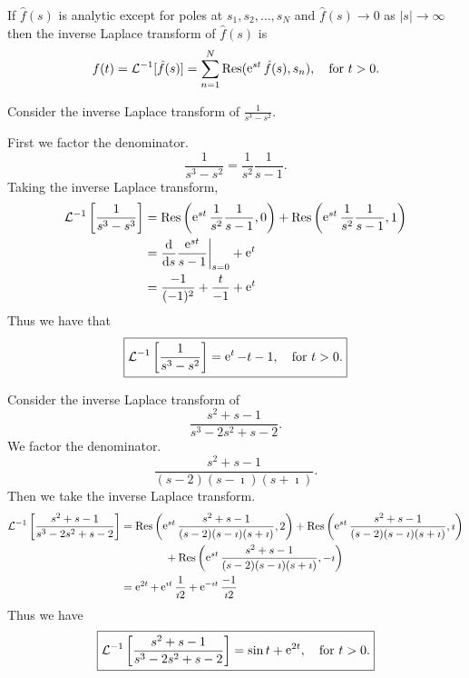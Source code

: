\begin{Result}
  \label{Res_lt_poles}
  If $\hat{f}(s)$ is analytic except for poles at $s_1, s_2, \ldots, s_N$ and 
  $\hat{f}(s) \to 0$ as $|s| \to \infty$ then the inverse Laplace transform of 
  $\hat{f}(s)$ is
  \[ 
  f(t) = \mathcal{L}^{-1}[\hat{f}(s)] = \sum_{n=1}^N \mathop{\mathrm{Res}}\nolimits(\mathop{\mathrm{e}}\nolimits^{s t} \hat{f}(s), s_n), 
  \quad \mathrm{for}\ t > 0.
  \]
\end{Result}













\begin{Example}
  Consider the inverse Laplace transform of $\frac{1}{s^3 - s^2}$.

  First we factor the denominator.
  \[ 
  \frac{1}{s^3 - s^2} = \frac{1}{s^2} \frac{1}{s-1}. 
  \]
  Taking the inverse Laplace transform,
  \begin{align*}
    \mathcal{L}^{-1} \left[ \frac{1}{s^3-s^3} \right]
    &= \mathop{\mathrm{Res}}\nolimits \left( \mathop{\mathrm{e}}\nolimits^{s t} \frac{1}{s^2} \frac{1}{s-1}, 0 \right) + 
    \mathop{\mathrm{Res}}\nolimits \left( \mathop{\mathrm{e}}\nolimits^{s t} \frac{1}{s^2} \frac{1}{s-1}, 1 \right) \\
    &= \frac{\mathrm{d}}{\mathrm{d} s} \frac{\mathop{\mathrm{e}}\nolimits^{s t}}{s-1}\bigg|_{s=0} + \mathop{\mathrm{e}}\nolimits^t \\
    &= \frac{-1}{(-1)^2} + \frac{t}{-1} + \mathop{\mathrm{e}}\nolimits^t 
  \end{align*}
  Thus we have that
  \[ 
  \boxed{
    \mathcal{L}^{-1}\left[\frac{1}{s^3-s^2} \right] = \mathop{\mathrm{e}}\nolimits^t-t-1,
    \quad \mathrm{for}\ t > 0.
    }
  \]
\end{Example}







\begin{Example}
  Consider the inverse Laplace transform of
  \[ 
  \frac{s^2 + s - 1}{s^3 - 2s^2 + s - 2}.
  \]
  We factor the denominator.
  \[
  \frac{s^2 + s - 1}{(s - 2)(s - \imath)(s + \imath)}.
  \]
  Then we take the inverse Laplace transform.
  \begin{align*}
    \mathcal{L}^{-1}\left[\frac{s^2+s-1}{s^3-2s^2+s-2}\right]
    &= \mathop{\mathrm{Res}}\nolimits\left( \mathop{\mathrm{e}}\nolimits^{s t} \frac{s^2+s-1}{(s - 2)(s - \imath)(s + \imath)}, 2 \right)
    + \mathop{\mathrm{Res}}\nolimits \left( \mathop{\mathrm{e}}\nolimits^{s t} \frac{s^2+s-1}{(s - 2)(s - \imath)(s + \imath)}, \imath \right) \\
    &\qquad \qquad
    + \mathop{\mathrm{Res}}\nolimits \left( \mathop{\mathrm{e}}\nolimits^{s t} \frac{s^2+s-1}{(s - 2)(s - \imath)(s + \imath)}, -\imath \right) \\
    &= \mathop{\mathrm{e}}\nolimits^{2t} + \mathop{\mathrm{e}}\nolimits^{\imath t} \frac{1}{\imath 2} + \mathop{\mathrm{e}}\nolimits^{-\imath t} \frac{-1}{\imath 2}
  \end{align*}
  Thus we have
  \[
  \boxed{
    \mathcal{L}^{-1}\left[\frac{s^2+s-1}{s^3-2s^2+s-2}\right]
    = \sin t + \mathop{\mathrm{e}}\nolimits^{2t}, \quad \mathrm{for}\ t > 0.
    } 
  \]
\end{Example}









